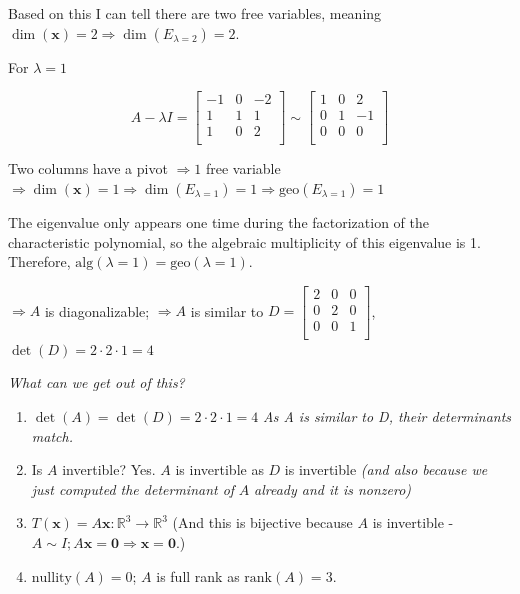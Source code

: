 \documentclass[
]{article}
\begin{document}
Based on this I can tell there are two free variables, meaning
$\dim\left( \mathbf{x} \right) = 2 \Rightarrow \dim\left( E_{\lambda = 2} \right) = 2$.

For $\lambda = 1$

$$A - \lambda I = \begin{bmatrix}
 - 1 & 0 & - 2 \\
1 & 1 & 1 \\
1 & 0 & 2 \\
\end{bmatrix}\sim\begin{bmatrix}
1 & 0 & 2 \\
0 & 1 & - 1 \\
0 & 0 & 0 \\
\end{bmatrix}$$

Two columns have a pivot $\Rightarrow 1$ free variable
$\Rightarrow \dim\left( \mathbf{x} \right) = 1 \Rightarrow \dim\left( E_{\lambda = 1} \right) = 1 \Rightarrow \text{geo}\left( E_{\lambda = 1} \right) = 1$

The eigenvalue only appears one time during the factorization of the
characteristic polynomial, so the algebraic multiplicity of this
eigenvalue is 1. Therefore,
$\text{alg}(\lambda = 1) = \text{geo}(\lambda = 1)$.

$\Rightarrow A$ is diagonalizable; $\Rightarrow A$ is similar to
$D = \begin{bmatrix}
2 & 0 & 0 \\
0 & 2 & 0 \\
0 & 0 & 1 \\
\end{bmatrix}$, $\det(D) = 2 \cdot 2 \cdot 1 = 4$

\emph{What can we get out of this?}

\begin{enumerate}
\def\labelenumi{\arabic{enumi}.}
\item
  $\det(A) = \det(D) = 2 \cdot 2 \cdot 1 = 4$ \emph{As A is similar to
  D, their determinants match.}
\item
  Is $A$ invertible? Yes. $A$ is invertible as $D$ is invertible
  \emph{(and also because we just computed the determinant of} $A$
  \emph{already and it is nonzero)}
\item
  $T\left( \mathbf{x} \right) = A\mathbf{x}:\mathbb{R}^{3} \rightarrow \mathbb{R}^{3}$
  (And this is bijective because $A$ is invertible -
  $A\sim I;A\mathbf{x} = \mathbf{0} \Rightarrow \mathbf{x} = \mathbf{0}$.)
\item
  $\text{nullity}(A) = 0$; $A$ is full rank as
  $\text{rank}(A) = 3$.
\end{enumerate}
\end{document}

